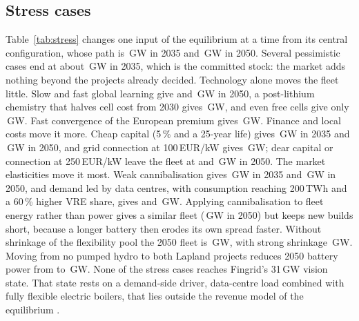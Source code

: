 \documentclass[11pt]{article}
\newcommand{\EUR}{EUR}
\begin{document}
\subsection{Stress cases}\label{sec:stress}
Table~\ref{tab:stress} changes one input of the equilibrium at a time from its central configuration, whose path is \,GW in 2035 and \,GW in 2050.
Several pessimistic cases end at about \,GW in 2035, which is the committed stock: the market adds nothing beyond the projects already decided.
Technology alone moves the fleet little. Slow and fast global learning give  and \,GW in 2050, a post-lithium chemistry that halves cell cost from 2030 gives \,GW, and even free cells give only \,GW. Fast convergence of the European premium gives \,GW.
Finance and local costs move it more. Cheap capital (5\,\% and a 25-year life) gives \,GW in 2035 and \,GW in 2050, and grid connection at 100\,\EUR/kW gives \,GW; dear capital or connection at 250\,\EUR/kW leave the fleet at  and \,GW in 2050.
The market elasticities move it most. Weak cannibalisation gives \,GW in 2035 and \,GW in 2050, and demand led by data centres, with consumption reaching 200\,TWh and a 60\,\% higher VRE share, gives  and \,GW.
Applying cannibalisation to fleet energy rather than power gives a similar fleet (\,GW in 2050) but keeps new builds short, because a longer battery then erodes its own spread faster.
Without shrinkage of the flexibility pool the 2050 fleet is \,GW, with strong shrinkage \,GW. Moving from no pumped hydro to both Lapland projects reduces 2050 battery power from  to \,GW.
None of the stress cases reaches Fingrid's 31\,GW vision state. That state rests on a demand-side driver, data-centre load combined with fully flexible electric boilers, that lies outside the revenue model of the equilibrium \citep{fingrid2025vision2040}.
\end{document}
